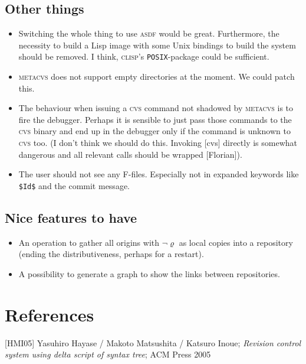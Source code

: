 \documentclass[fleqn, 10pt, a4paper]{report}
\begin{document}
\subsection{Other things}
\begin{itemize}
\item Switching the whole thing to use \textsc{asdf} would be great.
Furthermore, the necessity to build a Lisp image with some Unix bindings
to build the system should be removed. I think, \textsc{clisp}'s
\texttt{POSIX}-package could be sufficient.
\item \textsc{metacvs} does not support empty directories at the moment.
We could patch this.
\item The behaviour when issuing a \textsc{cvs} command not shadowed by
\textsc{metacvs} is to fire the debugger. Perhaps it is sensible to
just pass those commands to the \textsc{cvs} binary and end up in the debugger
only if the command is unknown to \textsc{cvs} too.
(I don't think we should do this. Invoking \textsc[cvs] directly
is somewhat dangerous and all relevant calls should be wrapped [Florian]).
\item The user should not see any F-files. Especially not in
expanded keywords like \texttt{\$Id\$} and the commit message.
\end{itemize}

\subsection{Nice features to have}

\begin{itemize}
\item An operation to gather all origins with $\neg \varrho$ as
local copies into a repository (ending the distributiveness, perhaps
for a restart).
\item A possibility to generate a graph to show the links between
repositories.
\end{itemize}

\section{References}

\begin{thebibliography}{Loe99}
[HMI05] Yasuhiro Hayase / Makoto Matsushita / Katsuro
  Inoue; \emph{Revision control system using delta script of syntax
    tree}; ACM Press 2005
\end{thebibliography}
\end{document}
